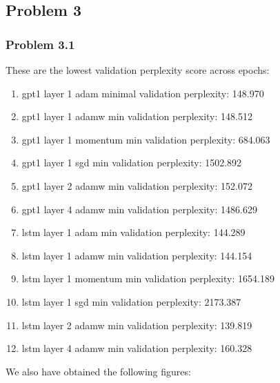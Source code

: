 \documentclass[12pt]{article}
\theoremstyle{definition}
\begin{document}
\subsection*{Problem 3}
\subsubsection*{Problem 3.1}

These are the lowest validation perplexity score across epochs:
\begin{enumerate}
  \item gpt1 layer 1 adam minimal validation perplexity: 148.970
  \item gpt1 layer 1 adamw min validation perplexity: 148.512
  \item gpt1 layer 1 momentum min validation perplexity: 684.063
  \item gpt1 layer 1 sgd min validation perplexity: 1502.892
  \item gpt1 layer 2 adamw min validation perplexity: 152.072
  \item gpt1 layer 4 adamw min validation perplexity: 1486.629
  \item lstm layer 1 adam min validation perplexity: 144.289
  \item lstm layer 1 adamw min validation perplexity: 144.154
  \item lstm layer 1 momentum min validation perplexity: 1654.189
  \item lstm layer 1 sgd min validation perplexity: 2173.387
  \item lstm layer 2 adamw min validation perplexity: 139.819
  \item lstm layer 4 adamw min validation perplexity: 160.328
\end{enumerate}

We also have obtained the following figures:
\end{document}

